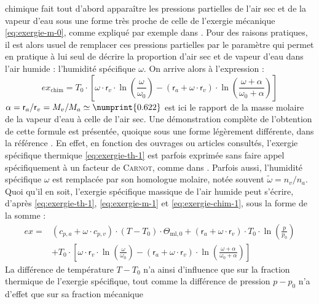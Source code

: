 \documentclass[a4paper,11pt]{scrartcl}
\begin{document}
chimique fait tout d'abord apparaître les pressions partielles de l'air sec et
de la vapeur d'eau sous une forme très proche de celle de l'exergie mécanique
\eqref{eq:exergie-m-0}, comme expliqué par exemple dans \cite{TI-BE8015}. Pour des raisons pratiques, il est alors usuel de remplacer ces pressions partielles par le paramètre qui permet en pratique à
lui seul de décrire la proportion d'air sec et de vapeur d'eau dans l'air
humide : l'humidité spécifique $\omega$. On arrive alors à l'expression :
\begin{equation}
	ex_{\text{chim}} = T_0 \cdot \left[ \omega \cdot \mathsf{r}_v \cdot
	\ln\left( \frac{\omega}{\omega_0} \right) - (\mathsf{r}_a + \omega \cdot
	\mathsf{r}_v) \cdot \ln\left( \frac{\omega+\alpha}{\omega_0+\alpha}
	\right) \right] \label{eq:exergie-chim-1}
\end{equation} $\alpha = \mathsf{r}_a/\mathsf{r}_v = M_v/M_a \simeq
\numprint{0.622}$ est ici le rapport de la masse molaire de la vapeur d'eau à
celle de l'air sec. Une démonstration complète de l'obtention de cette formule
est présentée, quoique sous une forme légèrement différente, dans la référence
\cite[page 213]{Bejan-2006}. En effet, en fonction des ouvrages ou articles consultés,
l'exergie spécifique thermique \eqref{eq:exergie-th-1} est parfois exprimée sans
faire appel spécifiquement à un facteur de \textsc{Carnot}, comme dans
\cite{ASHRAE-1979,Bejan-2006}. Parfois aussi, l'humidité spécifique $\omega$ est
remplacée par son homologue molaire, notée souvent $\tilde{\omega} = n_v/n_a$.
Quoi qu'il en soit, l'exergie spécifique massique de l'air humide peut s'écrire,
d'après \eqref{eq:exergie-th-1}, \eqref{eq:exergie-m-1} et
\eqref{eq:exergie-chim-1}, sous la forme de la somme : \begin{equation}
	\begin{split}
		ex = & \left( c_{p,a} + \omega \cdot c_{p,v} \right) \cdot
		(T-T_0) \cdot \Theta_{\text{ml},0} + (\mathsf{r}_a + \omega
		\cdot \mathsf{r}_v) \cdot T_0 \cdot \ln\left( \frac{p}{p_0}
		\right) \\
		& + T_0 \cdot \left[ \omega \cdot \mathsf{r}_v \cdot \ln\left(
		\frac{\omega}{\omega_0} \right) - (\mathsf{r}_a + \omega \cdot
		\mathsf{r}_v) \cdot \ln\left(
		\frac{\omega+\alpha}{\omega_0+\alpha} \right) \right]
	\end{split} \label{eq:exergie-specifique}
\end{equation} La différence de température $T-T_0$ n'a ainsi d'influence que
sur la fraction \og thermique \fg de l'exergie spécifique, tout comme la
différence de pression $p-p_0$ n'a d'effet que sur sa fraction \og mécanique
\end{document}
